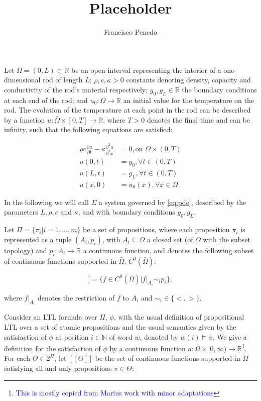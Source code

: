 \documentclass{article}
\title{Placeholder}
\author{Francisco Penedo}
\newcommand*{\R}{\mathbb{R}}
\newcommand*{\N}{\mathbb{N}}
\newcommand*{\psat}[1]{[[#1]]}
\newcommand*{\fran}[1]{\textcolor{blue}{#1}}
\begin{document}
Let $\Omega = (0, L) \subset \R$ be an open interval representing the interior
of a one-dimensional rod of length $L$; $\rho, c, \kappa > 0$ 
constants denoting density, capacity and conductivity of the rod's material respectively;
$g_0, g_L \in \R$ the boundary conditions at each end of the rod; and $u_0 :
\Omega \rightarrow \R$ an initial value for the temperature on the rod. 
The evolution of the temperature at
each point in the rod can be described by a function $u : \bar \Omega \times [0,
T] \rightarrow \R$, where $T > 0$ denotes the final time and can be infinity, 
such that the following equations are satisfied:

\begin{equation}\label{eq:pde}
    \begin{aligned}
        \rho c \frac{\partial u}{\partial t} - \kappa \frac{\partial^2
        u}{\partial^2 x} &= 0, \text{on } \Omega \times (0, T) \\
        u(0, t) &= g_0, \forall t \in (0, T) \\
        u(L, t) &= g_L, \forall t \in (0, T) \\
        u(x, 0) &= u_0(x), \forall x \in \Omega
    \end{aligned}
\end{equation}

In the following we will call $\Sigma$ a system governed by \eqref{eq:pde},
described by the parameters $L, \rho, c$ and $\kappa$, and with boundary
conditions $g_0, g_L$.

Let $\Pi = \{\pi_i | i = 1, ..., m\}$ be a set of propositions, where each
proposition $\pi_i$ is represented as a tuple $(A_i, p_i)$, with $A_i \subseteq
\Omega$ a closed set (of $\Omega$ with the subset topology) and $p_i : A_i
\rightarrow \R$ a continuous function, and denotes the following subset of
continuous functions supported in $\bar\Omega$, $C^0(\bar\Omega)$:

\begin{equation}
    \psat{\pi_i} = \{ f \in C^0(\bar\Omega) | \left.f\right|_{A_i} \sim_i p_i \},
\end{equation}

where $\left.f\right|_{A_i}$ denotes the restriction of $f$ to $A_i$ and $\sim_i
\in \{<, >\}$.

Consider an LTL formula over $\Pi$, $\phi$, with the usual definition of
propositional LTL over a set of atomic propositions and the usual semantics
given by the satisfaction of $\phi$ at position $i \in \N$ of word $w$, denoted
by $w(i) \models \phi$. We give a definition for the satisfaction of $\phi$ by a
continuous function $a : \bar \Omega \times [0, \infty) \rightarrow
\R$\footnote{\fran{This is mostly copied from Marius work with minor
adaptations}}. For each $\Theta \in 2^\Pi$, let $\psat{\Theta}$ be the set of
continuous functions supported in $\bar\Omega$ satisfying all and only
propositions $\pi \in \Theta$:
\end{document}
